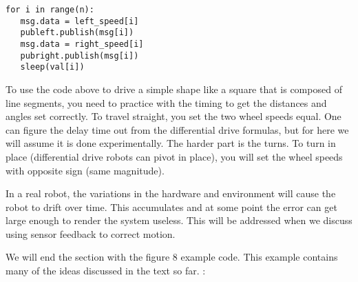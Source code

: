 \begin{verbatim}
for i in range(n):
   msg.data = left_speed[i]
   publeft.publish(msg[i])
   msg.data = right_speed[i]
   pubright.publish(msg[i])
   sleep(val[i])
\end{verbatim}

To use the code above to drive a simple shape like a square that is
composed of line segments, you need to practice with the timing to get
the distances and angles set correctly. To travel straight, you set the
two wheel speeds equal. One can figure the delay time out from the
differential drive formulas, but for here we will assume it is done
experimentally. The harder part is the turns. To turn in place
(differential drive robots can pivot in place), you will set the wheel
speeds with opposite sign (same magnitude).

In a real robot, the variations in the hardware and environment will
cause the robot to drift over time. This accumulates and at some point
the error can get large enough to render the system useless. This will
be addressed when we discuss using sensor feedback to correct motion.

We will end the section with the figure 8 example code. This example
contains many of the ideas discussed in the text so far. :

